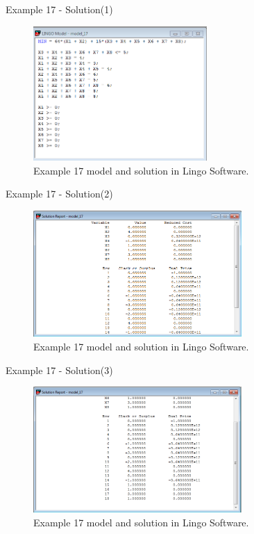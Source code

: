 \begin{frame}{Example 17 - Solution(1)}
\begin{figure}
    \includegraphics[width=250px]{slides/ex17/screenshot_a.png}
    \caption{Example 17 model and solution in Lingo Software.}
\end{figure}
\end{frame}

\begin{frame}{Example 17 - Solution(2)}
\begin{figure}
    \includegraphics[width=300px]{slides/ex17/screenshot_b.png}
    \caption{Example 17 model and solution in Lingo Software.}
\end{figure}
\end{frame}


\begin{frame}{Example 17 - Solution(3)}
\begin{figure}
    \includegraphics[width=300px]{slides/ex17/screenshot_c.png}
    \caption{Example 17 model and solution in Lingo Software.}
\end{figure}
\end{frame}

